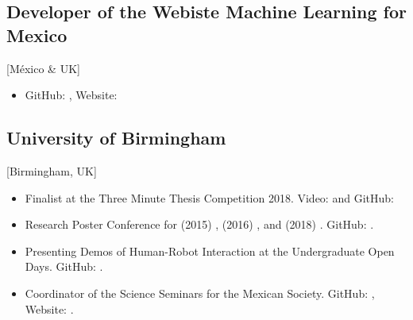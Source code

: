 \documentclass{mycv}
\begin{document}
\subsection{Developer of the Webiste Machine Learning for Mexico}[M\'exico \& UK]
\begin{itemize}
\item GitHub: \href{https://github.com/ML4MX}{\faGithubAlt}, Website: \href{https://ml4mx.github.io/website/}{\faExternalLink} 
\end{itemize}



\subsection{University of Birmingham}[Birmingham, UK]
\begin{positions}
\end{positions}
\begin{itemize}
\item  Finalist at the Three Minute Thesis Competition 2018. Video: \href{https://www.youtube.com/watch?v=07ewRYcS-0g}{\faYoutube} and 
GitHub: \href{https://github.com/mxochicale/3mt}{\faGithubAlt} 

\item Research Poster Conference for 
(2015) \href{https://github.com/mxochicale/PhD/blob/master/posters/Research_Poster_Conference_UoB/2015/poster/poster.pdf}{\faImage}, 
(2016) \href{https://github.com/mxochicale/PhD/blob/master/posters/Research_Poster_Conference_UoB/2016/poster/poster.pdf}{\faImage}, and  
(2018) \href{https://github.com/mxochicale/PhD/blob/master/posters/Research_Poster_Conference_UoB/2018/poster/main/map479-poster-uob2018.pdf}{\faImage}.
GitHub: \href{https://github.com/mxochicale/PhD/tree/master/posters/Research_Poster_Conference_UoB}{\faGithubAlt}. \\

\item Presenting Demos of Human-Robot Interaction at the Undergraduate Open Days. GitHub: \href{https://github.com/mxochicale/opendayuob-hridemo}{\faGithubAlt}. 

\item Coordinator of the Science Seminars for the Mexican Society.  GitHub: \href{https://github.com/MexicanSocietyUoB}{\faGithubAlt}, Website: \href{https://mexicansocietyuob.github.io/seminars/}{\faExternalLink}. 

\end{itemize}
\end{document}
